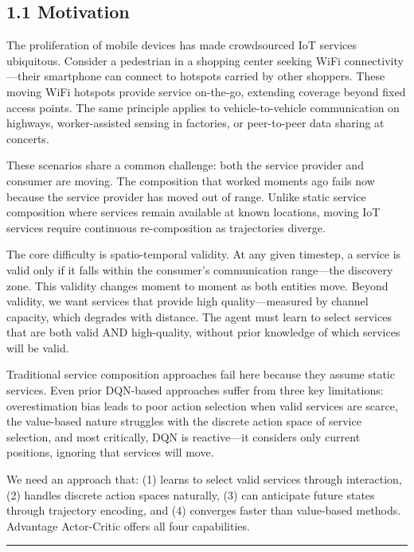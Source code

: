 \subsection{1.1 Motivation}\label{motivation}

The proliferation of mobile devices has made crowdsourced IoT services
ubiquitous. Consider a pedestrian in a shopping center seeking WiFi
connectivity---their smartphone can connect to hotspots carried by other
shoppers. These moving WiFi hotspots provide service on-the-go,
extending coverage beyond fixed access points. The same principle
applies to vehicle-to-vehicle communication on highways, worker-assisted
sensing in factories, or peer-to-peer data sharing at concerts.

These scenarios share a common challenge: both the service provider and
consumer are moving. The composition that worked moments ago fails now
because the service provider has moved out of range. Unlike static
service composition where services remain available at known locations,
moving IoT services require continuous re-composition as trajectories
diverge.

The core difficulty is spatio-temporal validity. At any given timestep,
a service is valid only if it falls within the consumer's communication
range---the discovery zone. This validity changes moment to moment as
both entities move. Beyond validity, we want services that provide high
quality---measured by channel capacity, which degrades with distance.
The agent must learn to select services that are both valid AND
high-quality, without prior knowledge of which services will be valid.

Traditional service composition approaches fail here because they assume
static services. Even prior DQN-based approaches suffer from three key
limitations: overestimation bias leads to poor action selection when
valid services are scarce, the value-based nature struggles with the
discrete action space of service selection, and most critically, DQN is
reactive---it considers only current positions, ignoring that services
will move.

We need an approach that: (1) learns to select valid services through
interaction, (2) handles discrete action spaces naturally, (3) can
anticipate future states through trajectory encoding, and (4) converges
faster than value-based methods. Advantage Actor-Critic offers all four
capabilities.

\begin{center}\rule{0.5\linewidth}{0.5pt}\end{center}

\hypertarget{background-and-related-work}{}
